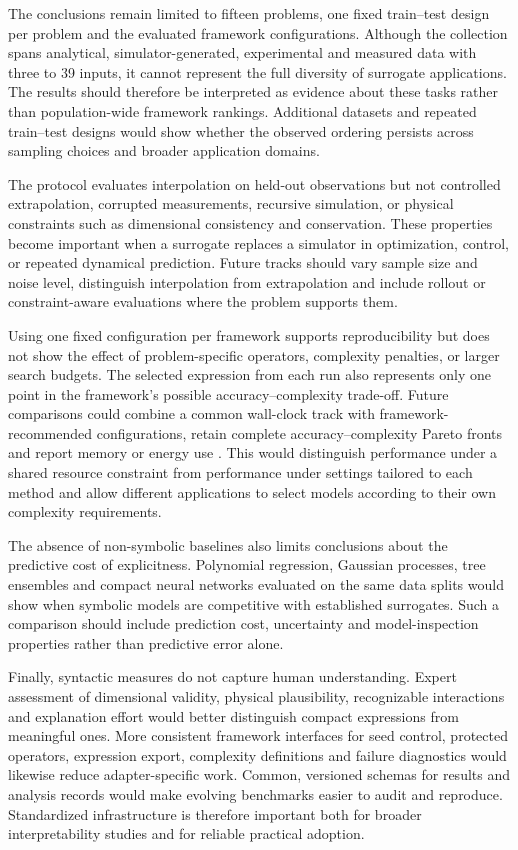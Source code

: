 \documentclass[12pt,oneside,bibtotoc,liststotoc]{scrbook}
\begin{document}
The conclusions remain limited to fifteen problems, one fixed train--test design per problem and the evaluated framework configurations. Although the collection spans analytical, simulator-generated, experimental and measured data with three to 39 inputs, it cannot represent the full diversity of surrogate applications. The results should therefore be interpreted as evidence about these tasks rather than population-wide framework rankings. Additional datasets and repeated train--test designs would show whether the observed ordering persists across sampling choices and broader application domains.

The protocol evaluates interpolation on held-out observations but not controlled extrapolation, corrupted measurements, recursive simulation, or physical constraints such as dimensional consistency and conservation. These properties become important when a surrogate replaces a simulator in optimization, control, or repeated dynamical prediction. Future tracks should vary sample size and noise level, distinguish interpolation from extrapolation and include rollout or constraint-aware evaluations where the problem supports them.

Using one fixed configuration per framework supports reproducibility but does not show the effect of problem-specific operators, complexity penalties, or larger search budgets. The selected expression from each run also represents only one point in the framework's possible accuracy--complexity trade-off. Future comparisons could combine a common wall-clock track with framework-recommended configurations, retain complete accuracy--complexity Pareto fronts and report memory or energy use \cite{defranca2025srbench,aldeia2025call}. This would distinguish performance under a shared resource constraint from performance under settings tailored to each method and allow different applications to select models according to their own complexity requirements.

The absence of non-symbolic baselines also limits conclusions about the predictive cost of explicitness. Polynomial regression, Gaussian processes, tree ensembles and compact neural networks evaluated on the same data splits would show when symbolic models are competitive with established surrogates. Such a comparison should include prediction cost, uncertainty and model-inspection properties rather than predictive error alone.

Finally, syntactic measures do not capture human understanding. Expert assessment of dimensional validity, physical plausibility, recognizable interactions and explanation effort would better distinguish compact expressions from meaningful ones. More consistent framework interfaces for seed control, protected operators, expression export, complexity definitions and failure diagnostics would likewise reduce adapter-specific work. Common, versioned schemas for results and analysis records would make evolving benchmarks easier to audit and reproduce. Standardized infrastructure is therefore important both for broader interpretability studies and for reliable practical adoption.
\end{document}
